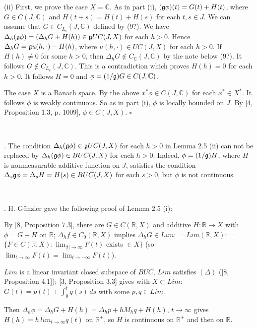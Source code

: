 \documentclass[10pt,onside,reqno]{amsart}
\newcommand{\Cdb}{\mbox{$\mathbb{C}$}}
\newcommand{\Rdb}{\mbox{$\mathbb{R}$}}
\theoremstyle{remark}
\theoremstyle{definition}
\begin{document}
(ii) First, we prove the case $X=\Cdb$. As in part (i),  $(\frak{g}\phi) (t) = G(t)+ H(t)$, where $G\in C(J,\Cdb)$ and $H (t+s)=H(t) +H(s)$ for each $t, s \in J$. We can assume that   $G\in C_{L_c}(J,\Cdb) $ defined by (9?).  We have
$\Delta_h(\frak{g} \phi)= (\Delta_h G  + H(h))\in \frak{g} UC (J,X)$ for each $ h >0$. Hence $ \Delta_h G  = \frak{g} u(h,\cdot)- H(h) $,  where $u(h,\cdot)\in  UC (J,X)$  for each $h > 0$.  If $H(h)\not = 0$ for some $h >0$, then  $\Delta_h G\not \in C_{\Cdb} (J,\Cdb)$ by the note below (9?). It follows $G \not\in C_{L_c} (J,\Cdb)$. This is a contradiction which proves $H(h) = 0$ for each $h > 0$. It follows $H=0$ and $\phi = (1/\frak{g})G\in C(J,\Cdb)$.

The case $X$ is a Banach space. By the above $x^* \phi \in  C(J,\Cdb)$ for each $x^* \in X^*$.   It follows $\phi$ is weakly continuous.   So as in part (i), $\phi$ is locally bounded on $J$.  By [4, Proposition 1.3, p. 1009], $\phi \in C(J,X)$.
$\square$

\

 . The condition $\Delta_h (\frak{g} \phi) \in\frak{g}  UC (J,X)$ for each $ h >0$ in Lemma 2.5 (ii) can not be replaced by  $\Delta_h (\frak{g} \phi) \in  BUC (J,X)$ for each $ h >0$. Indeed, $\phi= (1/\frak{g}) H$, where $H$ is nonmeasurable additive function on $J$,  satisfies the condition $\Delta_s \frak{g}\phi= \Delta_s H= H(s)\in BUC(J,X)$ for each $s > 0 $, but $\phi$ is not continuous.

\

  . H. G\"{u}nzler gave the following proof of Lemma 2.5 (i):
   
   By  [8, Proposition 7.3], there are  $G\in C(\Rdb,X)$ and additive $H : \Rdb \to X$ with   $\phi  = G + H$  on $\Rdb$; $\Delta_h f  \in  C_0 (\Rdb,X)$ implies $\Delta_h G  \in  Lim : = Lim(\Rdb,X) : =$
$\{F \in  C(\Rdb,X) : \lim_{|t| \to \infty} F(t)$ exists $\in X \}$   (so $\lim_{t \to \infty}  F (t)  =  \lim_{t \to -\infty} F (t)$).


\noindent $Lim$ is a linear invariant closed subspace of $BUC$, $Lim$ satisfies $(\Delta)$  ([8, Proposition 4.1]); [3, Proposition 3.3] gives with $X \subset Lim $:  $G (t)= p(t) + \int _0^t q(s)\, ds$ with some $p, q \in Lim$.

Then $ \Delta_h \phi  =  \Delta_h G +  H(h) = \Delta_h p + h M_h q + H(h)$, $t \to \infty$ gives  $H(h) = h\, lim_{t\to \infty} q (t)$  on $ \Rdb^+$, so $H$ is continuous on $\Rdb^+$ and then on $\Rdb$.
\end{document}
